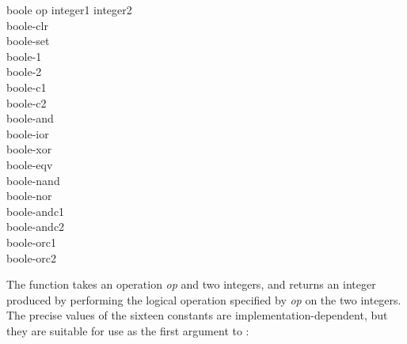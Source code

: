 \begin{defun}[Function][Constant]
boole op integer1 integer2 \\
boole-clr \\
boole-set \\
boole-1 \\
boole-2 \\
boole-c1 \\
boole-c2 \\
boole-and \\
boole-ior \\
boole-xor \\
boole-eqv \\
boole-nand \\
boole-nor \\
boole-andc1 \\
boole-andc2 \\
boole-orc1 \\
boole-orc2

The function  takes an operation {\it op} and two integers,
and returns an integer produced by performing the logical operation
specified by {\it op} on the two integers.  The precise values of
the sixteen constants are implementation-dependent, but they are
suitable for use as the first argument to :



\end{defun}
